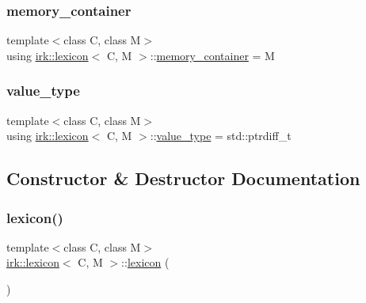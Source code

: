 \mbox{\label{classirk_1_1lexicon_a2097b1f4bfc324504a9fe10af681b0be}} 
\subsubsection{\texorpdfstring{memory\+\_\+container}{memory\_container}}
{\footnotesize\ttfamily template$<$class C, class M$>$ \\
using \mbox{\hyperlink{classirk_1_1lexicon}{irk\+::lexicon}}$<$ C, M $>$\+::\mbox{\hyperlink{classirk_1_1lexicon_a2097b1f4bfc324504a9fe10af681b0be}{memory\+\_\+container}} =  M}

\mbox{\label{classirk_1_1lexicon_aeac00a0cdd67339d9d09783a1c930dd2}} 
\subsubsection{\texorpdfstring{value\+\_\+type}{value\_type}}
{\footnotesize\ttfamily template$<$class C, class M$>$ \\
using \mbox{\hyperlink{classirk_1_1lexicon}{irk\+::lexicon}}$<$ C, M $>$\+::\mbox{\hyperlink{classirk_1_1lexicon_aeac00a0cdd67339d9d09783a1c930dd2}{value\+\_\+type}} =  std\+::ptrdiff\+\_\+t}



\subsection{Constructor \& Destructor Documentation}
\mbox{\label{classirk_1_1lexicon_a6edaaa02c9188690d6e8fcdf1ed11b4b}} 
\subsubsection{\texorpdfstring{lexicon()}{lexicon()}\hspace{0.1cm}{\footnotesize\ttfamily [1/4]}}
{\footnotesize\ttfamily template$<$class C, class M$>$ \\
\mbox{\hyperlink{classirk_1_1lexicon}{irk\+::lexicon}}$<$ C, M $>$\+::\mbox{\hyperlink{classirk_1_1lexicon}{lexicon}} (\begin{DoxyParamCaption}{ }\end{DoxyParamCaption})\hspace{0.3cm}{\ttfamily [delete]}}

